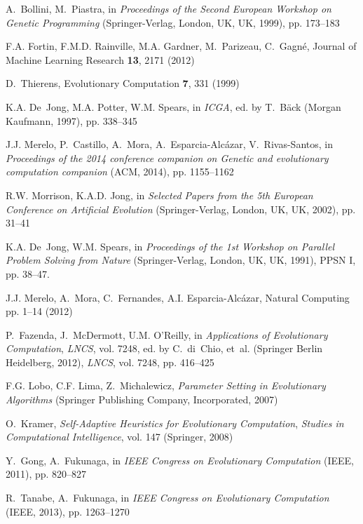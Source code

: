 \begin{thebibliography}{10}
A.~Bollini, M.~Piastra, in \emph{Proceedings of the Second European Workshop on
  Genetic Programming} (Springer-Verlag, London, UK, UK, 1999), pp. 173--183

F.A. Fortin, F.M.D. Rainville, M.A. Gardner, M.~Parizeau, C.~Gagn\'e, Journal
  of Machine Learning Research \textbf{13}, 2171 (2012)

D.~Thierens, Evolutionary Computation \textbf{7}, 331 (1999)

K.A. De~Jong, M.A. Potter, W.M. Spears, in \emph{ICGA}, ed. by T.~B\"ack
  (Morgan Kaufmann, 1997), pp. 338--345

J.J. Merelo, P.~Castillo, A.~Mora, A.~Esparcia-Alc{\'a}zar, V.~Rivas-Santos, in
  \emph{Proceedings of the 2014 conference companion on Genetic and
  evolutionary computation companion} (ACM, 2014), pp. 1155--1162

R.W. Morrison, K.A.D. Jong, in \emph{Selected Papers from the 5th European
  Conference on Artificial Evolution} (Springer-Verlag, London, UK, UK, 2002),
  pp. 31--41

K.A. De~Jong, W.M. Spears, in \emph{Proceedings of the 1st Workshop on Parallel
  Problem Solving from Nature} (Springer-Verlag, London, UK, UK, 1991), PPSN I,
  pp. 38--47.

J.J. Merelo, A.~Mora, C.~Fernandes, A.I. Esparcia-Alc{\'a}zar, Natural
  Computing pp. 1--14 (2012)

P.~Fazenda, J.~McDermott, U.M. O'Reilly, in \emph{Applications of Evolutionary
  Computation}, \emph{LNCS}, vol. 7248, ed. by C.~di~Chio, et~al. (Springer
  Berlin Heidelberg, 2012), \emph{LNCS}, vol. 7248, pp. 416--425

F.G. Lobo, C.F. Lima, Z.~Michalewicz, \emph{Parameter Setting in Evolutionary
  Algorithms} (Springer Publishing Company, Incorporated, 2007)

O.~Kramer, \emph{Self-Adaptive Heuristics for Evolutionary Computation},
  \emph{Studies in Computational Intelligence}, vol. 147 (Springer, 2008)

Y.~Gong, A.~Fukunaga, in \emph{IEEE Congress on Evolutionary Computation}
  (IEEE, 2011), pp. 820--827

R.~Tanabe, A.~Fukunaga, in \emph{IEEE Congress on Evolutionary Computation}
  (IEEE, 2013), pp. 1263--1270

\end{thebibliography}







